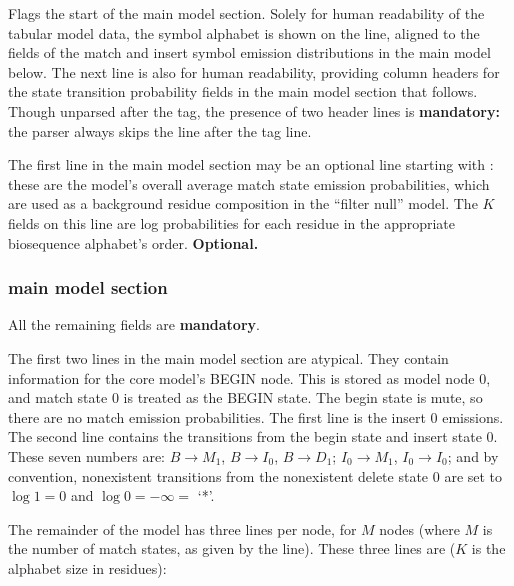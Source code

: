 \begin{sreitems}{}
\item [\emprog{HMM }] Flags the start of the main model
section. Solely for human readability of the tabular model data, the
symbol alphabet is shown on the  line, aligned to the fields
of the match and insert symbol emission distributions in the main
model below. The next line is also for human readability, providing
column headers for the state transition probability fields in the main
model section that follows. Though unparsed after the  tag,
the presence of two header lines is \textbf{mandatory:} the parser
always skips the line after the  tag line.

\item [\emprog{COMPO <f>*K}] The first line in the main model section
may be an optional line starting with : these are the
model's overall average match state emission probabilities, which are
used as a background residue composition in the ``filter null''
model. The $K$ fields on this line are log probabilities for each
residue in the appropriate biosequence alphabet's
order. \textbf{Optional.}

\end{sreitems}

\subsubsection{main model section}

All the remaining fields are \textbf{mandatory}.

The first two lines in the main model section are atypical. They
contain information for the core model's BEGIN node. This is stored as
model node 0, and match state 0 is treated as the BEGIN state.  The
begin state is mute, so there are no match emission probabilities. The
first line is the insert 0 emissions. The second line contains the
transitions from the begin state and insert state 0.  These seven
numbers are: $B \rightarrow M_1$, $B \rightarrow I_0$, $B \rightarrow
D_1$; $I_0 \rightarrow M_1$, $I_0 \rightarrow I_0$; and by convention,
nonexistent transitions from the nonexistent delete state 0 are set to
$\log 1 = 0$ and $\log 0 = -\infty = $ `*'.

The remainder of the model has three lines per node, for $M$ nodes
(where $M$ is the number of match states, as given by the 
line). These three lines are ($K$ is the alphabet size in residues):

